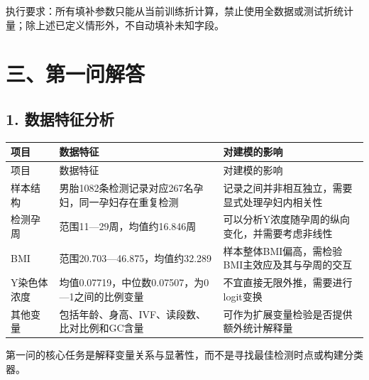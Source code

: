 \documentclass[UTF8,12pt,a4paper]{ctexart}
\begin{document}
执行要求：所有填补参数只能从当前训练折计算，禁止使用全数据或测试折统计量；除上述已定义情形外，不自动填补未知字段。

\section{三、第一问解答}
\subsection{1. 数据特征分析}
\begingroup
\footnotesize
\setlength{\tabcolsep}{1.5pt}
\begin{longtable}{|>{\raggedright\arraybackslash}p{}|>{\raggedright\arraybackslash}p{}|>{\raggedright\arraybackslash}p{}|}
\hline
项目 & 数据特征 & 对建模的影响 \\ \hline
\endfirsthead
\hline
项目 & 数据特征 & 对建模的影响 \\ \hline
\endhead
样本结构 & 男胎1082条检测记录对应267名孕妇，同一孕妇存在重复检测 & 记录之间并非相互独立，需要显式处理孕妇内相关性 \\ \hline
检测孕周 & 范围11—29周，均值约16.846周 & 可以分析Y浓度随孕周的纵向变化，并需要考虑非线性 \\ \hline
BMI & 范围20.703—46.875，均值约32.289 & 样本整体BMI偏高，需检验BMI主效应及其与孕周的交互 \\ \hline
Y染色体浓度 & 均值0.07719，中位数0.07507，为0—1之间的比例变量 & 不宜直接无限外推，需要进行logit变换 \\ \hline
其他变量 & 包括年龄、身高、IVF、读段数、比对比例和GC含量 & 可作为扩展变量检验是否提供额外统计解释量 \\ \hline
\end{longtable}
\endgroup

第一问的核心任务是解释变量关系与显著性，而不是寻找最佳检测时点或构建分类器。
\end{document}
